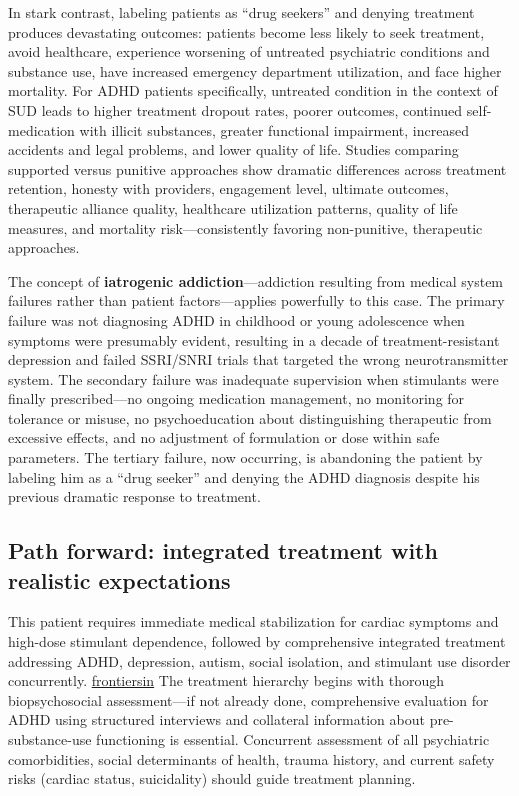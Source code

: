 In stark contrast, labeling patients as ``drug seekers'' and denying treatment produces devastating outcomes: patients become less likely to seek treatment, avoid healthcare, experience worsening of untreated psychiatric conditions and substance use, have increased emergency department utilization, and face higher mortality. For ADHD patients specifically, untreated condition in the context of SUD leads to higher treatment dropout rates, poorer outcomes, continued self-medication with illicit substances, greater functional impairment, increased accidents and legal problems, and lower quality of life. Studies comparing supported versus punitive approaches show dramatic differences across treatment retention, honesty with providers, engagement level, ultimate outcomes, therapeutic alliance quality, healthcare utilization patterns, quality of life measures, and mortality risk---consistently favoring non-punitive, therapeutic approaches.

The concept of \textbf{iatrogenic addiction}---addiction resulting from medical system failures rather than patient factors---applies powerfully to this case. The primary failure was not diagnosing ADHD in childhood or young adolescence when symptoms were presumably evident, resulting in a decade of treatment-resistant depression and failed SSRI/SNRI trials that targeted the wrong neurotransmitter system. The secondary failure was inadequate supervision when stimulants were finally prescribed---no ongoing medication management, no monitoring for tolerance or misuse, no psychoeducation about distinguishing therapeutic from excessive effects, and no adjustment of formulation or dose within safe parameters. The tertiary failure, now occurring, is abandoning the patient by labeling him as a ``drug seeker'' and denying the ADHD diagnosis despite his previous dramatic response to treatment.

\subsection{Path forward: integrated treatment with realistic expectations}\label{10c_self_medication-path-forward-integrated-treatment-with-realistic-expectations}

This patient requires immediate medical stabilization for cardiac symptoms and high-dose stimulant dependence, followed by comprehensive integrated treatment addressing ADHD, depression, autism, social isolation, and stimulant use disorder concurrently. \href{https://www.frontiersin.org/journals/psychiatry/articles/10.3389/fpsyt.2019.00311/full}{frontiersin} The treatment hierarchy begins with thorough biopsychosocial assessment---if not already done, comprehensive evaluation for ADHD using structured interviews and collateral information about pre-substance-use functioning is essential. Concurrent assessment of all psychiatric comorbidities, social determinants of health, trauma history, and current safety risks (cardiac status, suicidality) should guide treatment planning.

